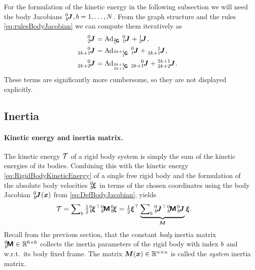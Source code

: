 \begin{Example}
For the formulation of the kinetic energy in the following subsection we will need the body Jacobians $\bodyJac{0}{\BidxII}, \BidxII=1,\ldots,\numRigidBodies$.
From the graph structure and the rules \eqref{eq:rulesBodyJacobian} we can compute them iteratively as
\begin{subequations}
\begin{align}
 \bodyJac{0}{2} &= \Ad{\bodyHomoCoord{2}{1}} \ \bodyJac{0}{1} + \bodyJac{1}{2},
\\
 \bodyJac{0}{2k+1} &= \Ad{\bodyHomoCoord{2k+1}{1}} \ \bodyJac{0}{1} + \bodyJac{1}{2k+1},
\\
 \bodyJac{0}{2k+2} &= \Ad{\bodyHomoCoord{2k+2}{2k+1}} \ \bodyJac{0}{2k+1} + \bodyJac{2k+1}{2k+2}.
\end{align}
\end{subequations}
These terms are significantly more cumbersome, so they are not displayed explicitly.
\end{Example}



\subsection{Inertia}\label{sec:RBSInertia}
\paragraph{Kinetic energy and inertia matrix.}
The kinetic energy $\mathcal{T}$ of a rigid body system is simply the sum of the kinetic energies of its bodies.
Combining this with the kinetic energy \eqref{eq:RigidBodyKineticEnergy} of a single free rigid body and the formulation of the absolute body velocities $\bodyVel{0}{\BidxII}$ in terms of the chosen coordinates using the body Jacobian $\bodyJac{0}{\BidxII}(\sysCoord)$ from \eqref{eq:DefBodyJacobian}, yields
\begin{align}\label{eq:RBSKineticEnergy}
 \kineticEnergy
 &= \sumBodies \tfrac{1}{2} \bodyVel{0}{\BidxII}^\top \bodyInertiaMat{0}{\BidxII}\bodyVel{0}{\BidxII}
 = \tfrac{1}{2} \sysVel^\top \underbrace{\sumBodies \bodyJac{0}{\BidxII}^\top \bodyInertiaMat{0}{\BidxII} \bodyJac{0}{\BidxII}}_{\sysInertiaMat} \sysVel.
\end{align}
Recall from the previous section, that the constant \textit{body} inertia matrix $\bodyInertiaMat{0}{\BidxII} \in \RealNum^{6\times6}$ collects the inertia parameters of the rigid body with index $b$ and w.r.t.\ its body fixed frame. 
The matrix $\boldsymbol{M}(\boldsymbol{x}) \in \mathbb{R}^{n\times n}$ is called the \textit{system} inertia matrix.

